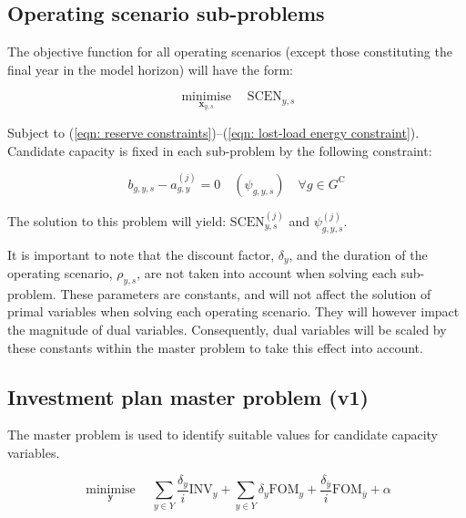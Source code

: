 \documentclass{article}
\newcommand{\sGeneratorsCandidate}{G^{\mathrm{C}}}
\newcommand{\sYears}{Y}
\newcommand{\iGenerator}{g}
\newcommand{\iYear}{y}
\newcommand{\iYearTerminal}{\overline{\iYear}}
\newcommand{\iScenario}{s}
\newcommand{\cFixedOperationsMaintenanceCost}[1][\iYear]{\mathrm{FOM}_{#1}}
\newcommand{\cScenarioDuration}[1][\iYear,\iScenario]{\rho_{#1}}
\newcommand{\cInvestmentCost}[1][\iYear]{\mathrm{INV}_{#1}}
\newcommand{\cInterestRate}{i}
\newcommand{\cOperatingCostScenario}[1][\iYear,\iScenario]{\mathrm{SCEN}_{#1}}
\newcommand{\cDiscountRate}[1][\iYear]{\delta_{#1}}
\newcommand{\vInstalledCapacityTotal}[1][\iGenerator,\iYear]{a_{#1}}
\newcommand{\vInstalledCapacityTotalScenario}[1][\iGenerator,\iYear,\iScenario]{b_{#1}}
\newcommand{\vFixedCapacityDual}[1][\iGenerator,\iYear,\iScenario]{\psi_{#1}}
\DeclareMathOperator*{\minimise}{minimise}
\begin{document}
\subsection{Operating scenario sub-problems}
The objective function for all operating scenarios (except those constituting the final year in the model horizon) will have the form:

\begin{equation}
	\minimise\limits_{\bm{x}_{\iYear,\iScenario}} \quad \cOperatingCostScenario 
\end{equation}

Subject to (\ref{eqn: reserve constraints})--(\ref{eqn: lost-load energy constraint}). Candidate capacity is fixed in each sub-problem by the following constraint: 

\begin{equation}
\vInstalledCapacityTotalScenario - \vInstalledCapacityTotal^{(j)} = 0 \quad (\vFixedCapacityDual) \quad \forall \iGenerator \in \sGeneratorsCandidate
\end{equation}

The solution to this problem will yield: $\cOperatingCostScenario^{(j)}$ and $\vFixedCapacityDual^{(j)}$.

It is important to note that the discount factor, $\cDiscountRate$, and the duration of the operating scenario, $\cScenarioDuration$, are not taken into account when solving each sub-problem. These parameters are constants, and will not affect the solution of primal variables when solving each operating scenario. They will however impact the magnitude of dual variables. Consequently, dual variables will be scaled by these constants within the master problem to take this effect into account.

\subsection{Investment plan master problem (v1)}
The master problem is used to identify suitable values for candidate capacity variables.

\begin{equation}
	\minimise\limits_{\bm{y}} \quad \sum\limits_{\iYear \in \sYears} \frac{\cDiscountRate}{\cInterestRate}\cInvestmentCost + \sum\limits_{\iYear \in \sYears} \cDiscountRate \cFixedOperationsMaintenanceCost  + \frac{\cDiscountRate[\iYearTerminal]}{\cInterestRate} \cFixedOperationsMaintenanceCost[\iYearTerminal] + \alpha
\end{equation}
\end{document}
